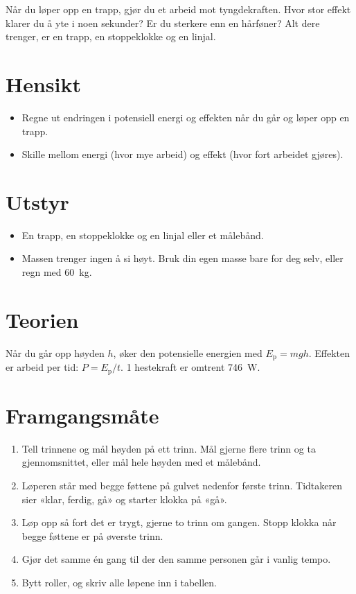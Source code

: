 \documentclass[11pt]{article}
\begin{document}

Når du løper opp en trapp, gjør du et arbeid mot tyngdekraften. Hvor stor effekt klarer du å yte i noen sekunder? Er du sterkere enn en hårføner? Alt dere trenger, er en trapp, en stoppeklokke og en linjal.

\section*{Hensikt}

\begin{itemize}
\item Regne ut endringen i potensiell energi og effekten når du går og løper opp en trapp.
\item Skille mellom energi (hvor mye arbeid) og effekt (hvor fort arbeidet gjøres).
\end{itemize}

\section*{Utstyr}

\begin{itemize}
\item En trapp, en stoppeklokke og en linjal eller et målebånd.
\item Massen trenger ingen å si høyt. Bruk din egen masse bare for deg selv, eller regn med 60~kg.
\end{itemize}

\section*{Teorien}

Når du går opp høyden $h$, øker den potensielle energien med $E_{\mathrm{p}} = mgh$. Effekten er arbeid per tid: $P = E_{\mathrm{p}}/t$. 1 hestekraft er omtrent 746~W.

\section*{Framgangsmåte}

\begin{enumerate}
\item Tell trinnene og mål høyden på ett trinn. Mål gjerne flere trinn og ta gjennomsnittet, eller mål hele høyden med et målebånd.
\item Løperen står med begge føttene på gulvet nedenfor første trinn. Tidtakeren sier «klar, ferdig, gå» og starter klokka på «gå».
\item Løp opp så fort det er trygt, gjerne to trinn om gangen. Stopp klokka når begge føttene er på øverste trinn.
\item Gjør det samme én gang til der den samme personen går i vanlig tempo.
\item Bytt roller, og skriv alle løpene inn i tabellen.
\end{enumerate}
\end{document}
